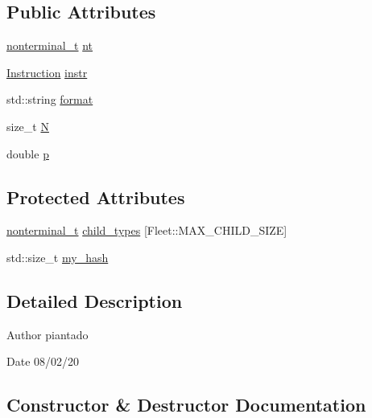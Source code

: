 \subsection*{Public Attributes}
\begin{DoxyCompactItemize}
\item 
\hyperlink{_nonterminal_8h_a5c1f658dc7560600a16d22408bd716ca}{nonterminal\+\_\+t} \hyperlink{class_rule_a980385e76137909454bd6a585bd2e138}{nt}
\item 
\hyperlink{class_instruction}{Instruction} \hyperlink{class_rule_a367e578f5e1427ef04d1d77477565c67}{instr}
\item 
std\+::string \hyperlink{class_rule_aa48c15aaaf5242afea0439607f2a2177}{format}
\item 
size\+\_\+t \hyperlink{class_rule_a0a2a742af39b60831ad1ac5eb5ba7498}{N}
\item 
double \hyperlink{class_rule_acd7e4d41d59dec76f60ca16238ab391a}{p}
\end{DoxyCompactItemize}
\subsection*{Protected Attributes}
\begin{DoxyCompactItemize}
\item 
\hyperlink{_nonterminal_8h_a5c1f658dc7560600a16d22408bd716ca}{nonterminal\+\_\+t} \hyperlink{class_rule_a2d5160625d3d15f60690c4323522a33e}{child\+\_\+types} \mbox{[}Fleet\+::\+M\+A\+X\+\_\+\+C\+H\+I\+L\+D\+\_\+\+S\+I\+ZE\mbox{]}
\item 
std\+::size\+\_\+t \hyperlink{class_rule_af2d873c97e2de425f14a5a980dbcc104}{my\+\_\+hash}
\end{DoxyCompactItemize}


\subsection{Detailed Description}
\begin{DoxyAuthor}{Author}
piantado 
\end{DoxyAuthor}
\begin{DoxyDate}{Date}
08/02/20 
\end{DoxyDate}


\subsection{Constructor \& Destructor Documentation}
\mbox{\label{class_rule_a1e65fa1bce404b1513038a9dd4ffcb9f}} 
